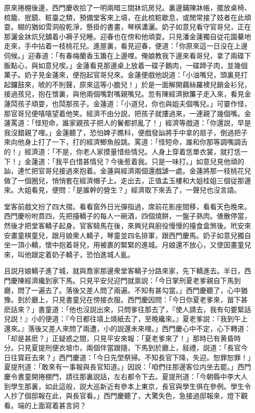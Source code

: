 原來捲棚後邊，西門慶收拾了一明兩暗三間牀炕房兒。裏邊鋪陳牀帳，擺放桌椅、梳籠、抿鏡、粧臺之類，預備堂客來上墳，在此梳粧歇息，或閒常接了妓者在此頑耍。糊的猶如雪洞般乾淨，懸掛的書畫，琴棋瀟灑。奶子如意兒看守官哥兒，正在那灑金牀炕兒舖着小褥子兒睡。迎春也在傍和他頑耍。只見潘金蓮獨自従花園驀地走來，手中拈着一枝桃花兒。進屋裏，看見迎春，便道：「你原來這一日没在上邊伺候。」迎春道：「有春梅蘭香玉簫在上邊哩。俺娘教我下邊來看哥兒，拿了兩碟下飯點心，與如意兒喫。」金蓮看見那邊桌上放着一碟子鵝肉，一碟蹄子肉，並幾個菓子。奶子見金蓮來，便抱起官哥兒來。金蓮便戲他説道：「小油嘴兒，頭裏見打起鑼鼓來，唬的不則聲，原來這等小膽兒！」於是一面解開藕絲羅襖兒銷金衫兒，接過孩兒，抱在懷裏，與他兩個嘴對嘴親嘴兒。忽有陳經濟掀簾子走入來，看見金蓮鬦孩子頑耍，也鬦那孩子。金蓮道：「小道兒，你也與姐夫個嘴兒。」可霎作怪，那官哥兒便嘻嘻望着他笑。經濟不由分説，把孩子就摟過來，一連親了幾個嘴。金蓮罵道：「怪短命，誰家親孩子把人的鬢都抓亂了！」經濟等戲道：「你還説，早是我沒錯親了哩。」金蓮聽了，恐怕婢子瞧科，便戲發訕將手中拿的扇子，倒過把子來向他身上打了一下，打的經濟鯽魚般跳。罵道：「怪短命，誰和你那等調嘴調舌的！」經濟道：「不是，你老人家摸量惜些情兒。人身上穿着恁單衣裳，就打恁一下！」金蓮道：「我平白惜甚情兒？今後惹着我。只是一味打。」如意兒見他頑的訕，連忙把官哥兒接過來抱着。金蓮與經濟兩個還戲謔一處。金蓮將那一枝桃花兒做了一個圈兒，悄悄套在經濟帽子上。走出去，正值孟玉樓和大姐桂姐三個従那邊來。大姐看見，便問：「是誰幹的營生？」經濟取下來丢了，一聲兒也沒言語。

堂客前戲文扮了四大摺。看看窗外日光彈指過，席前花影座間移，看看天色晚來。西門慶吩咐賁四，先把擡轎子的每人一碗酒，四個燒餅，一盤子熟肉。俵散停當，然後才把堂客轎子起身。官客騎馬在後，來興兒與廚役慢慢的擡食盒煞後。玳安來安畫童棋童兒，跟月娘衆人轎子，琴童並四名排軍，跟西門慶馬。奶子如意兒獨自坐一頂小轎，懷中抱着哥兒，用被裹的緊緊的進城。月娘還不放心，又使囬畫童兒來，叫他跟定着奶子轎子，恐怕進城人亂。

且説月娘轎子進了城，就與喬家那邊衆堂客轎子分路來家，先下轎進去。半日，西門慶陳經濟纔到家下馬。只見平安兒迎門就禀説：「今日掌刑夏老爹親自下馬到廳，問了一遍去了。落後又差人問了兩遍。不知有甚勾當。」西門慶聽了，心中猶豫。到於廳上，只見書童兒在傍接衣服。西門慶因問：「今日你夏老爹來，㽞下甚麽話來？」書童道：「他也沒説出來，只問爹往那去了，『使人請去，我有句要緊話兒説！』小的便道：『今日都往墳上燒紙去了，至晚纔來。』夏老爹説：『我到午上還來。』落後又差人來問了兩遭，小的説還未來哩。」西門慶心中不定，心下轉道：「却是甚麽？」正疑惑之間，只見平安來報：「夏老爹來了！」那時已有黄昏時分。只見夏提刑便衣坡巾，兩個伴當跟隨，下馬到於廳上，敍禮，説道：「長官今日往寳莊去來？」西門慶道：「今日先塋祭掃。不知長官下降，失迎。恕罪恕罪！」夏提刑道：「敢來有一事報與長官知道。」因説：「咱們往那邊客位内坐去罷。」西門慶令書童開捲棚門，請往那裏説話，左右都令下去。夏提刑道：「今朝縣中李大人到學生那裏，如此這般，説大巡新近有參本上東京，長官與學生俱在參例。學生令人抄了個邸報在此，與長官看。」西門慶聽了，大驚失色，急接過邸報來，燈下觀看。端的上面寫着甚言詞？

